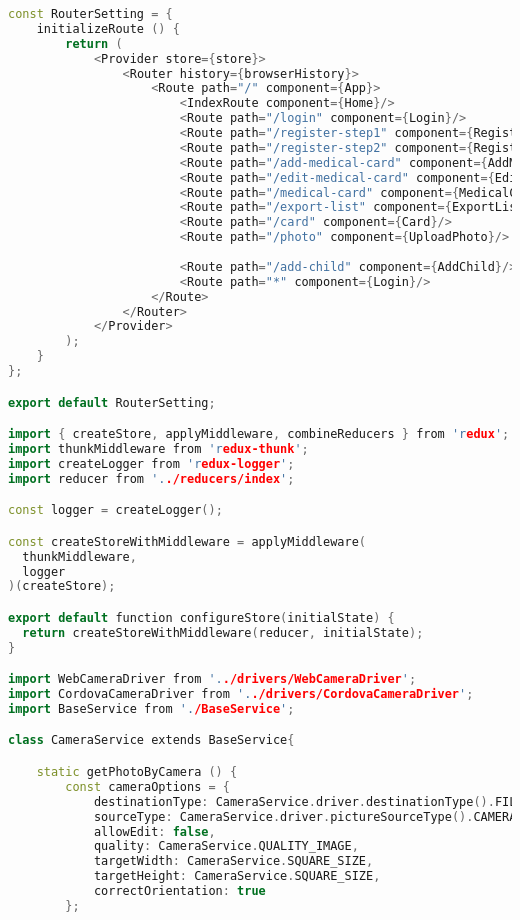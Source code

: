 \begin{lstlisting}[language=C++, style=cplusplusstyle]
const RouterSetting = {
    initializeRoute () {
        return (
            <Provider store={store}>
                <Router history={browserHistory}>
                    <Route path="/" component={App}>
                        <IndexRoute component={Home}/>
                        <Route path="/login" component={Login}/>
                        <Route path="/register-step1" component={RegistrationStep1}/>
                        <Route path="/register-step2" component={RegistrationStep2}/>
                        <Route path="/add-medical-card" component={AddMedicalCard}/>
                        <Route path="/edit-medical-card" component={EditMedicalCard}/>
                        <Route path="/medical-card" component={MedicalCard}/>
                        <Route path="/export-list" component={ExportList}/>
                        <Route path="/card" component={Card}/>
                        <Route path="/photo" component={UploadPhoto}/>
                        
                        <Route path="/add-child" component={AddChild}/>
                        <Route path="*" component={Login}/>
                    </Route>
                </Router>
            </Provider>
        );
    }
};

export default RouterSetting;

import { createStore, applyMiddleware, combineReducers } from 'redux';
import thunkMiddleware from 'redux-thunk';
import createLogger from 'redux-logger';
import reducer from '../reducers/index';

const logger = createLogger();

const createStoreWithMiddleware = applyMiddleware(
  thunkMiddleware,
  logger
)(createStore);

export default function configureStore(initialState) {
  return createStoreWithMiddleware(reducer, initialState);
}

import WebCameraDriver from '../drivers/WebCameraDriver';
import CordovaCameraDriver from '../drivers/CordovaCameraDriver';
import BaseService from './BaseService';

class CameraService extends BaseService{

    static getPhotoByCamera () {
        const cameraOptions = {
            destinationType: CameraService.driver.destinationType().FILE_URI,
            sourceType: CameraService.driver.pictureSourceType().CAMERA,
            allowEdit: false,
            quality: CameraService.QUALITY_IMAGE,
            targetWidth: CameraService.SQUARE_SIZE,
            targetHeight: CameraService.SQUARE_SIZE,
            correctOrientation: true
        };


\end{lstlisting}
